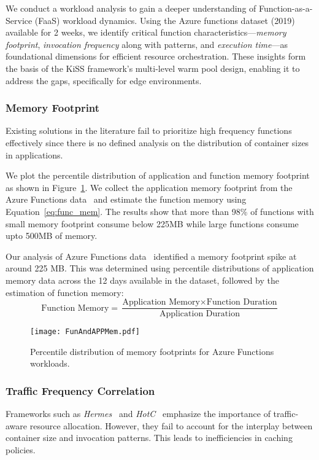 We conduct a workload analysis to gain a deeper understanding of Function-as-a-Service (FaaS) workload dynamics. Using the Azure functions dataset (2019)~\cite{mohammad_serverless_2020} available for 2 weeks, we identify critical function characteristics—\textit{memory footprint}, \textit{invocation frequency} along with patterns, and \textit{execution time}—as foundational dimensions for efficient resource orchestration. These insights form the basis of the KiSS framework's multi-level warm pool design, enabling it to address the gaps, specifically for edge environments.



\subsubsection{Memory Footprint}
Existing solutions in the literature fail to prioritize high frequency functions effectively since there is no defined analysis on the distribution of container sizes in applications. 

We plot the percentile distribution of application and function memory footprint as shown in Figure~\ref{fig:memory_footprint}.
We collect the application memory footprint from the Azure Functions data~\cite{mohammad_serverless_2020} and estimate the function memory using Equation~\ref{eq:func_mem}. 
The results show that more than 98\% of functions with small memory footprint consume below 225MB while large functions consume upto 500MB of memory. 


Our analysis of Azure Functions data~\cite{mohammad_serverless_2020} identified a memory footprint spike at around 225 MB. This was determined using percentile distributions of application memory data across the 12 days available in the dataset, followed by the estimation of function memory:
\begin{equation}\label{eq:func_mem}
    \text{Function Memory} = \frac{\text{Application Memory} \times \text{Function Duration}}{\text{Application Duration}}
\end{equation}


\begin{figure}[h]
    \centering
    \texttt{[image: FunAndAPPMem.pdf]}
    \caption{Percentile distribution of memory footprints for Azure Functions workloads.}
    \label{fig:memory_footprint}
\end{figure}

\subsubsection{Traffic Frequency Correlation}
Frameworks such as \textit{Hermes}~\cite{kaffes_practical_2021} and \textit{HotC}~\cite{suo_tackling_2021} emphasize the importance of traffic-aware resource allocation.
However, they fail to account for the interplay between container size and invocation patterns. This leads to inefficiencies in caching policies.




